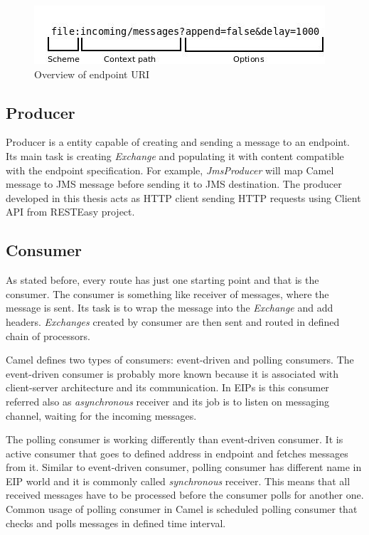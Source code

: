 \documentclass[12pt,final,oneside]{fithesis2}
\begin{document}
\begin{figure}
\centering
\includegraphics[width=0.9\linewidth]{images/Diagram1.jpeg}
\caption{Overview of endpoint URI}
\label{uri}
\end{figure}

\subsection*{Producer}
Producer is a entity capable of creating and sending a message to an endpoint. Its main task is creating \textit{Exchange} and populating it with content compatible with the endpoint specification. For example, \textit{JmsProducer} will map Camel message to JMS message before sending it to JMS destination. The producer developed in this thesis acts as HTTP client sending HTTP requests using Client API from RESTEasy project.


\subsection*{Consumer} 
As stated before, every route has just one starting point and that is the consumer. The consumer is something like receiver of messages, where the message is sent. Its task is to wrap the message into the \textit{Exchange} and add headers. \textit{Exchanges} created by consumer are then sent and routed in defined chain of processors.

Camel defines two types of consumers: event-driven and polling consumers. The event-driven consumer is probably more known because it is associated with client-server architecture and its communication. In EIPs is this consumer referred also as \textit{asynchronous} receiver and its job is to listen on messaging channel, waiting for the incoming messages.

The polling consumer is working differently than event-driven consumer. It is active consumer that goes to defined address in endpoint and fetches messages from it. Similar to event-driven consumer, polling consumer has different name in EIP world and it is commonly called \textit{synchronous} receiver. This means that all received messages have to be processed before the consumer polls for another one. Common usage of polling consumer in Camel is scheduled polling consumer that checks and polls messages in defined time interval.
\end{document}
